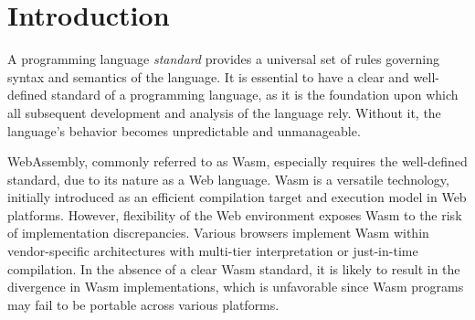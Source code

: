 \section{Introduction}\label{sec:intro}

A programming language \textit{standard} provides a universal set of rules
governing syntax and semantics of the language. It is essential to have a clear
and well-defined standard of a programming language, as it is the foundation
upon which all subsequent development and analysis of the language rely.
Without it, the language’s behavior becomes unpredictable and unmanageable.


WebAssembly, commonly referred to as Wasm, especially requires the well-defined
standard, due to its nature as a Web language.  Wasm is a versatile technology,
initially introduced as an efficient compilation target and execution model in
Web platforms.  However, flexibility of the Web environment exposes Wasm to the
risk of implementation discrepancies.  Various browsers implement Wasm within
vendor-specific architectures with multi-tier interpretation or just-in-time
compilation.  In the absence of a clear Wasm standard, it is likely to result
in the divergence in Wasm implementations, which is unfavorable since Wasm
programs may fail to be portable across various platforms.

